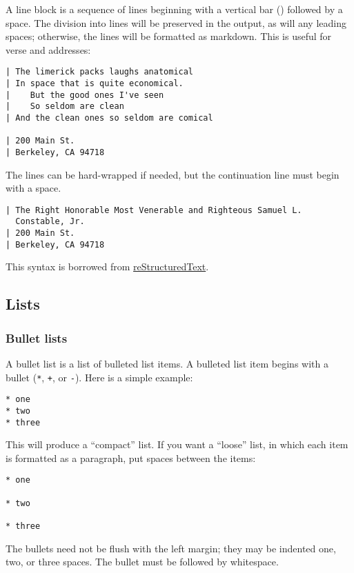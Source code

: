 \documentclass[]{article}
\begin{document}
A line block is a sequence of lines beginning with a vertical bar
(\texttt{\textbar{}}) followed by a space. The division into lines will
be preserved in the output, as will any leading spaces; otherwise, the
lines will be formatted as markdown. This is useful for verse and
addresses:

\begin{verbatim}
| The limerick packs laughs anatomical
| In space that is quite economical.
|    But the good ones I've seen
|    So seldom are clean
| And the clean ones so seldom are comical

| 200 Main St.
| Berkeley, CA 94718
\end{verbatim}

The lines can be hard-wrapped if needed, but the continuation line must
begin with a space.

\begin{verbatim}
| The Right Honorable Most Venerable and Righteous Samuel L.
  Constable, Jr.
| 200 Main St.
| Berkeley, CA 94718
\end{verbatim}

This syntax is borrowed from
\href{http://docutils.sourceforge.net/docs/ref/rst/introduction.html}{reStructuredText}.

\subsection{Lists}\label{lists}

\subsubsection{Bullet lists}\label{bullet-lists}

A bullet list is a list of bulleted list items. A bulleted list item
begins with a bullet (\texttt{*}, \texttt{+}, or \texttt{-}). Here is a
simple example:

\begin{verbatim}
* one
* two
* three
\end{verbatim}

This will produce a ``compact'' list. If you want a ``loose'' list, in
which each item is formatted as a paragraph, put spaces between the
items:

\begin{verbatim}
* one

* two

* three
\end{verbatim}

The bullets need not be flush with the left margin; they may be indented
one, two, or three spaces. The bullet must be followed by whitespace.
\end{document}
